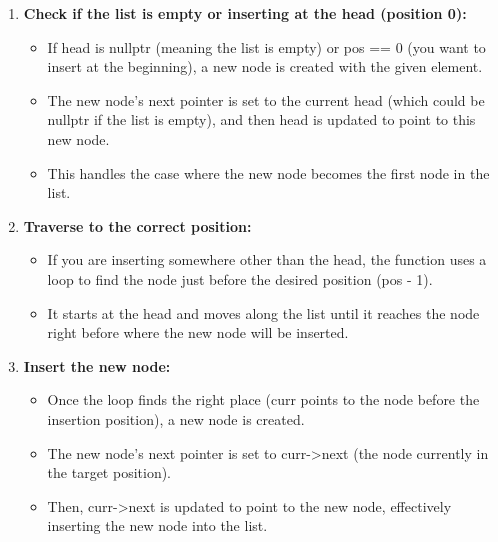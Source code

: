 \documentclass{report}
\begin{document}
    \begin{enumerate}
        \item \textbf{Check if the list is empty or inserting at the head (position 0):}
            \begin{itemize}
                \item If head is nullptr (meaning the list is empty) or pos == 0 (you want to insert at the beginning), a new node is created with the given element.
                \item The new node's next pointer is set to the current head (which could be nullptr if the list is empty), and then head is updated to point to this new node.
                \item This handles the case where the new node becomes the first node in the list.
            \end{itemize}
        \item \textbf{Traverse to the correct position:}
            \begin{itemize}
                \item If you are inserting somewhere other than the head, the function uses a loop to find the node just before the desired position (pos - 1).
                \item It starts at the head and moves along the list until it reaches the node right before where the new node will be inserted.
            \end{itemize}
        \item \textbf{Insert the new node:}
            \begin{itemize}
                \item Once the loop finds the right place (curr points to the node before the insertion position), a new node is created.
                \item The new node’s next pointer is set to curr->next (the node currently in the target position).
                \item Then, curr->next is updated to point to the new node, effectively inserting the new node into the list.
            \end{itemize}

    \end{enumerate}


    \pagebreak 
\end{document}
